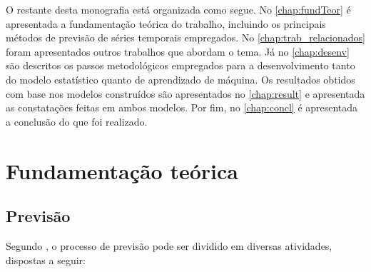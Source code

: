 \documentclass[
    12pt,
    oneside,
    a4paper,
    english,
    brazil
]{abntex2}
\begin{document}
O    restante   desta    monografia    está   organizada    como   segue.    No
\autoref{chap:fundTeor}  é apresentada  a  fundamentação  teórica do  trabalho,
incluindo os  principais métodos  de previsão  de séries  temporais empregados.
No  \autoref{chap:trab_relacionados} foram  apresentados  outros trabalhos  que
abordam  o   tema.  Já  no   \autoref{chap:desenv}  são  descritos   os  passos
metodológicos  empregados para  a desenvolvimento  tanto do  modelo estatístico
quanto  de  aprendizado  de  máquina.   Os  resultados  obtidos  com  base  nos
modelos construídos são apresentados  no \autoref{chap:result} e apresentada as
constatações  feitas  em ambos  modelos.  Por  fim, no  \autoref{chap:concl}  é
apresentada a conclusão do que foi realizado.

\chapter{Fundamentação teórica}\label{chap:fundTeor}

\section{Previsão}
Segundo  ,  o  processo  de previsão  pode  ser  dividido  em
diversas atividades, dispostas a seguir:
\end{document}
